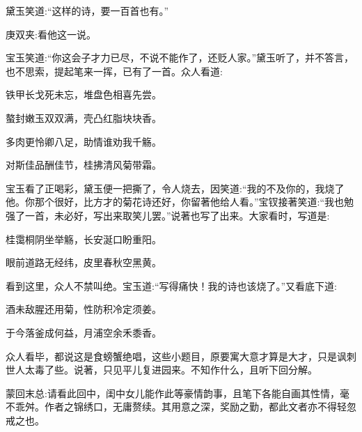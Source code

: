 \begin{parag}
    黛玉笑道:“这样的诗，要一百首也有。”\begin{note}庚双夹:看他这一说。\end{note}宝玉笑道:“你这会子才力已尽，不说不能作了，还贬人家。”黛玉听了，并不答言，也不思索，提起笔来一挥，已有了一首。众人看道:
\end{parag}


\begin{poem}
    \begin{pl}铁甲长戈死未忘，堆盘色相喜先尝。\end{pl}

    \begin{pl}螯封嫩玉双双满，壳凸红脂块块香。\end{pl}

    \begin{pl}多肉更怜卿八足，助情谁劝我千觞。\end{pl}

    \begin{pl}对斯佳品酬佳节，桂拂清风菊带霜。\end{pl}


\end{poem}


\begin{parag}
    宝玉看了正喝彩，黛玉便一把撕了，令人烧去，因笑道:“我的不及你的，我烧了他。你那个很好，比方才的菊花诗还好，你留著他给人看。”宝钗接著笑道:“我也勉强了一首，未必好，写出来取笑儿罢。”说著也写了出来。大家看时，写道是:
\end{parag}


\begin{poem}
    \begin{pl}桂霭桐阴坐举觞，长安涎口盼重阳。\end{pl}

    \begin{pl}眼前道路无经纬，皮里春秋空黑黄。\end{pl}

\end{poem}


\begin{parag}
    看到这里，众人不禁叫绝。宝玉道:“写得痛快！我的诗也该烧了。”又看底下道:
\end{parag}


\begin{poem}
    \begin{pl}酒未敌腥还用菊，性防积冷定须姜。\end{pl}

    \begin{pl}于今落釜成何益，月浦空余禾黍香。\end{pl}

\end{poem}


\begin{parag}
    众人看毕，都说这是食螃蟹绝唱，这些小题目，原要寓大意才算是大才，只是讽刺世人太毒了些。说著，只见平儿复进园来。不知作什么，且听下回分解。
\end{parag}


\begin{parag}
    \begin{note}蒙回末总:请看此回中，闺中女儿能作此等豪情韵事，且笔下各能自画其性情，毫不乖舛。作者之锦绣口，无庸赘续。其用意之深，奖励之勤，都此文者亦不得轻忽戒之也。\end{note}
\end{parag}
